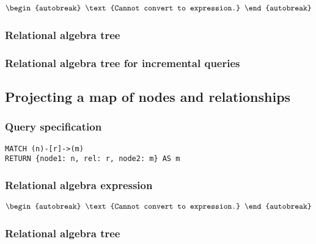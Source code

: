 \begin{align*}
\begin{autobreak}
\text{Cannot convert to expression.}
\end{autobreak}
\end{align*}

\subsubsection*{Relational algebra tree}


\subsubsection*{Relational algebra tree for incremental queries}


\subsection{Projecting a map of nodes and relationships}

\subsubsection*{Query specification}

\begin{lstlisting}
MATCH (n)-[r]->(m)
RETURN {node1: n, rel: r, node2: m} AS m
\end{lstlisting}

\subsubsection*{Relational algebra expression}

\begin{align*}
\begin{autobreak}
\text{Cannot convert to expression.}
\end{autobreak}
\end{align*}

\subsubsection*{Relational algebra tree}


